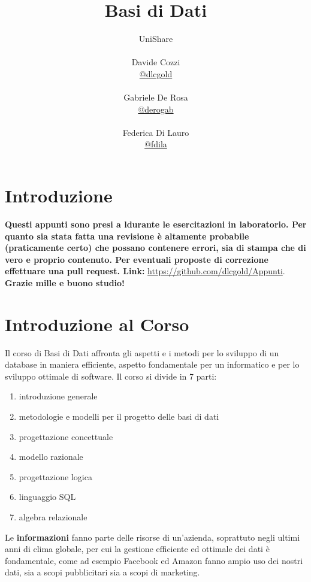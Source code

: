 \documentclass[a4paper,12pt, oneside]{book}
\title{Basi di Dati}
\author{UniShare\\\\Davide Cozzi\\\href{https://t.me/dlcgold}{@dlcgold}\\\\Gabriele De Rosa\\\href{https://t.me/derogab}{@derogab} \\\\Federica Di Lauro\\\href{https://t.me/f_dila}{@f\textunderscore dila}}
\date{}
\begin{document}
\maketitle

\newtheorem{teorema}{Teorema}
\newtheorem{definizione}{Definizione}
\newtheorem{esempio}{Esempio}
\newtheorem{corollario}{Corollario}
\newtheorem{lemma}{Lemma}
\newtheorem{osservazione}{Osservazione}
\newtheorem{nota}{Nota}
\newtheorem{esercizio}{Esercizio}
\tableofcontents
\renewcommand{\chaptermark}[1]{%
\markboth{\chaptername
\ \thechapter.\ #1}{}}
\renewcommand{\sectionmark}[1]{\markright{\thesection.\ #1}}
\chapter{Introduzione}
\textbf{Questi appunti sono presi a ldurante le esercitazioni in laboratorio. Per quanto sia stata fatta una revisione è altamente probabile (praticamente certo) che possano contenere errori, sia di stampa che di vero e proprio contenuto. Per eventuali proposte di correzione effettuare una pull request. Link: } \url{https://github.com/dlcgold/Appunti}.\\
\textbf{Grazie mille e buono studio!}
\chapter{Introduzione al Corso}
Il corso di Basi di Dati affronta gli aspetti e i metodi per lo sviluppo di un database in maniera efficiente,
aspetto fondamentale per un informatico e per lo sviluppo ottimale di software. \newline
Il corso si divide in 7 parti:
\begin{enumerate}
\item introduzione generale
\item metodologie e modelli per il progetto delle basi di dati
\item progettazione concettuale
\item modello razionale
\item progettazione logica
\item linguaggio SQL
\item algebra relazionale
\end{enumerate}
Le \textbf{informazioni} fanno parte delle risorse di un'azienda, soprattuto negli ultimi anni di clima globale,
per cui la gestione efficiente ed ottimale dei dati è fondamentale, come ad esempio Facebook ed Amazon fanno ampio
uso dei nostri dati, sia a scopi pubblicitari sia a scopi di marketing.
\end{document}
